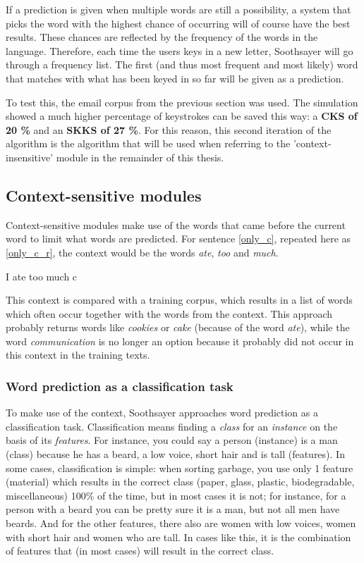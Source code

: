 \documentclass[12pt]{article}
\begin{document}
If a prediction is given when multiple words are still a possibility, a system that picks the word with the highest chance of occurring will of course have the best results. These chances are reflected by the frequency of the words in the language. Therefore, each time the users keys in a new letter, Soothsayer will go through a frequency list. The first (and thus most frequent and most likely) word that matches with what has been keyed in so far will be given as a prediction.

To test this, the email corpus from the previous section was used. The simulation showed a much higher percentage of keystrokes can be saved this way: a \textbf{CKS of 20 \%} and an \textbf{SKKS of 27 \%}. For this reason, this second iteration of the algorithm is the algorithm that will be used when referring to the 'context-insensitive' module in the remainder of this thesis.

\subsection{Context-sensitive modules} \label{cs}

Context-sensitive modules make use of the words that came before the current word to limit what words are predicted. For sentence \ref{only_c}, repeated here as \ref{only_c_r}, the context would be the words \emph{ate}, \emph{too} and \emph{much}.

\begin{examples}
\item I ate too much c \label{only_c_r}
\end{examples}

This context is compared with a training corpus, which results in a list of words which often occur together with the words from the context. This approach probably returns words like \emph{cookies} or \emph{cake} (because of the word \emph{ate}), while the word \emph{communication} is no longer an option because it probably did not occur in this context in the training texts.

\subsubsection{Word prediction as a classification task}

To make use of the context, Soothsayer approaches word prediction as a classification task. Classification means finding a \emph{class} for an \emph{instance} on the basis of its \emph{features}. For instance, you could say a person (instance) is a man (class) because he has a beard, a low voice, short hair and is tall (features). In some cases, classification is simple: when sorting garbage, you use only 1 feature (material) which results in the correct class (paper, glass, plastic, biodegradable, miscellaneous) 100\% of the time, but in most cases it is not; for instance, for a person with a beard you can be pretty sure it is a man, but not all men have beards. And for the other features, there also are women with low voices, women with short hair and women who are tall. In cases like this, it is the combination of features that (in most cases) will result in the correct class.
\end{document}
